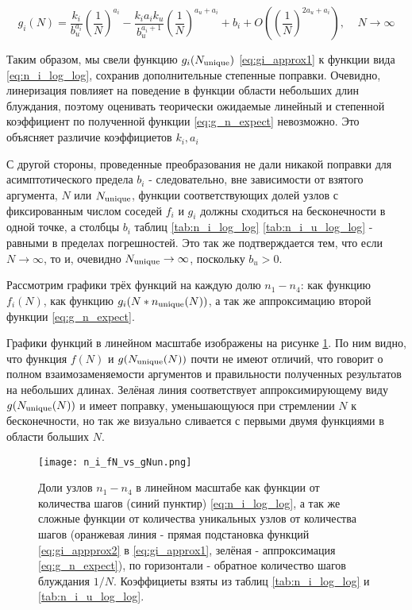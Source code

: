 \begin{large}
\begin{equation}
g_i(N) = \frac{k_i}{b_u^{a_i}} (\frac{1}{N})^{a_i} - \frac{k_i a_i k_u}{b_u^{a_i+1}} (\frac{1}{N})^{a_u+a_i} + b_i + O((\frac{1}{N})^{2 a_u +a_i}),\ \ \ \ \ N \to \infty
\end{equation}
\label{eq:g_n_expect}
\end{large}

Таким образом, мы свели функцию $g_i(N_{\textup{unique}})$ \eqref{eq:gi_approx1} к функции вида \eqref{eq:n_i_log_log}, сохранив дополнительные степенные поправки. 
Очевидно, линеризация повлияет на поведение в функции области небольших длин блуждания, поэтому оценивать теорически ожидаемые линейный и степенной коэффициент по полученной функции \eqref{eq:g_n_expect} невозможно.
Это объясняет различие коэффициетов $k_i, a_i$ 

С другой стороны, проведенные преобразования не дали никакой поправки для асимптотического предела $b_i$ - следовательно, вне зависимости от взятого аргумента, $N$ или $N_{\textup{unique}}$, функции соответствующих долей узлов с фиксированным числом соседей $f_i$ и $g_i$ должны сходиться на бесконечности в одной точке, а столбцы $b_i$ таблиц \ref{tab:n_i_log_log} \ref{tab:n_i_u_log_log} - равными в пределах погрешностей.
Это так же подтверждается тем, что если $N \to \infty$, то и, очевидно $N_{\textup{unique}} \to \infty$, поскольку $b_u > 0$.  

Рассмотрим графики трёх функций на каждую долю $n_1 - n_4$: как функцию $f_i(N)$, как функцию $g_i(N*n_{\textup{unique}}(N))$, а так же аппроксимацию второй функции \eqref{eq:g_n_expect}.

Графики функций в линейном масштабе изображены на рисунке \ref{fig:ni_fn_vs_gNun}. По ним видно, что функция $f(N)$ и $g(N_{\textup{unique}}(N))$ почти не имеют отличий, что говорит о полном взаимозаменяемости аргументов и правильности полученных результатов на небольших длинах. Зелёная линия соответствует аппроксимирующему виду $g(N_{\textup{unique}}(N))$ и имеет поправку, уменьшающуюся при стремлении $N$ к бесконечности, но так же визуально сливается с первыми двумя функциями в области больших $N$.

\begin{figure}
\centering
\texttt{[image: n\_i\_fN\_vs\_gNun.png]}
\label{fig:ni_fn_vs_gNun}
\caption{Доли узлов $n_1-n_4$ в линейном масштабе как функции от количества шагов (синий пунктир) \eqref{eq:n_i_log_log}, а так же сложные функции от количества уникальных узлов от количества шагов (оранжевая линия - прямая подстановка функций  \eqref{eq:gi_appprox2} в \eqref{eq:gi_approx1}, зелёная - аппроксимация \eqref{eq:g_n_expect}), по горизонтали - обратное количество шагов блуждания $1/N$. Коэффициеты взяты из таблиц \ref{tab:n_i_log_log} и \ref{tab:n_i_u_log_log}.}
\end{figure}

